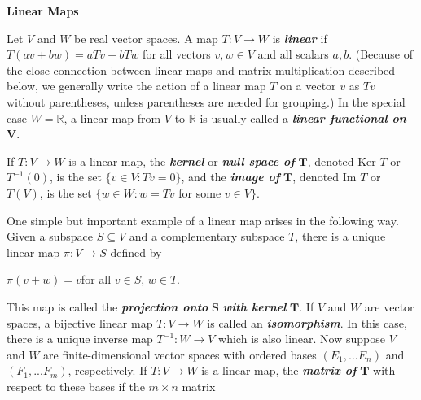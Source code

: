 \documentclass[12pt, a4paper]{article}
\begin{document}
\vspace{4mm}

\begin{flushleft}
\textbf{\large{Linear Maps}}
\end{flushleft}

Let $V$ and $W$ be real vector spaces. A map $T\colon V\rightarrow W$ is \textit{\textbf{linear}} if $T(av+bw)=aTv+bTw$ for all vectors $v,w\in V$ and all scalars $a,b$. (Because of the close connection between linear maps and matrix multiplication described below, we generally write the action of a linear map $T$ on a vector $v$ as $Tv$ without parentheses, unless parentheses are needed for grouping.) In the special case $W=\mathbb{R}$, a linear map from $V$ to $\mathbb{R}$ is usually called a \textit{\textbf{linear functional on}} $\bm{V}$.\par
If $T\colon V\rightarrow W$ is a linear map, the \textit{\textbf{kernel}} or \textit{\textbf{null space of}} $\bm{T}$, denoted Ker $T$ or $T^{-1}(0)$, is the set $\{v\in V \colon Tv=0\}$, and the \textit{\textbf{image of}} $\bm{T}$, denoted Im $T$ or $T(V)$, is the set $\{w\in W\colon w=Tv$ for some $v\in V\}$.\par
One simple but important example of a linear map arises in the following way. Given a subspace $S\subseteq V$ and a complementary subspace $T$, there is a unique linear map $\pi\colon V\rightarrow S$ defined by\par

\vspace{2mm}

\centerline{$\pi(v+w)=v$\hspace{5mm}for all $v\in S$, $w\in T$.}

\vspace{4mm}

This map is called the \textit{\textbf{projection onto}} $\bm{S}$ \textit{\textbf{with kernel}} $\bm{T}$. If $V$ and $W$ are vector spaces, a bijective linear map $T\colon V\rightarrow W$ is called an \textit{\textbf{isomorphism}}. In this case, there is a unique inverse map $T^{-1}\colon W\rightarrow V$ which is also linear. Now suppose $V$ and $W$ are finite-dimensional vector spaces with ordered bases $(E_1, ... E_n)$ and $(F_1, ... F_m)$, respectively. If $T\colon V\rightarrow W$ is a linear map, the \textit{\textbf{matrix of}} $\bm{T}$ with respect to these bases if the $m\times n$ matrix\par

\vspace{4mm}
\end{document}
